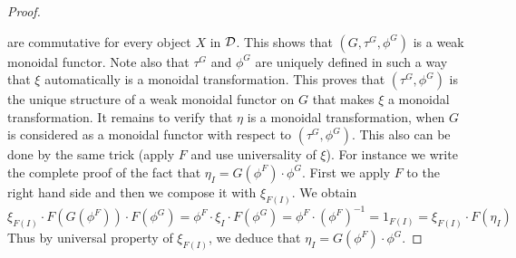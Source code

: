 \begin{proof}
\begin{center}
\end{center}
are commutative for every object $X$ in ${\mathcal D}$. This shows that $(G,\tau^G,\phi^G)$ is a weak monoidal functor. Note also that $\tau^G$ and $\phi^G$ are uniquely defined in such a way that $\xi$ automatically is a monoidal transformation. This proves that $(\tau^G,\phi^G)$ is the unique structure of a weak monoidal functor on $G$ that makes $\xi$ a monoidal transformation. It remains to verify that $\eta$ is a monoidal transformation, when $G$ is considered as a monoidal functor with respect to $(\tau^G, \phi^G)$. This also can be done by the same trick (apply $F$ and use universality of $\xi$). For instance we write the complete proof of the fact that $\eta_I = G(\phi^F)\cdot \phi^G$. First we apply $F$ to the right hand side and then we compose it with $\xi_{F(I)}$. We obtain
$$\xi_{F(I)}\cdot F(G(\phi^F))\cdot F(\phi^G)= \phi^F\cdot \xi_I\cdot F(\phi^G) = \phi^F\cdot \left(\phi^F\right)^{-1}=1_{F(I)} = \xi_{F(I)}\cdot F(\eta_{I}) $$
Thus by universal property of $\xi_{F(I)}$, we deduce that $\eta_I = G(\phi^F)\cdot \phi^G$.
\end{proof}

